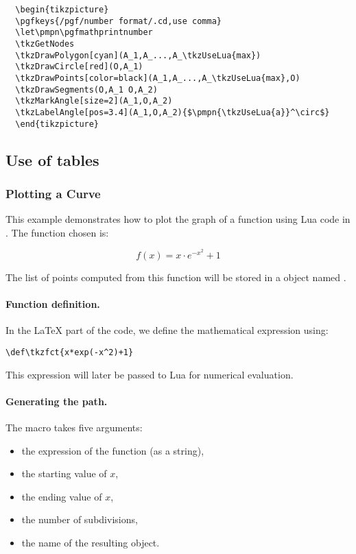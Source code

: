 \begin{verbatim}
  \begin{tikzpicture}
  \pgfkeys{/pgf/number format/.cd,use comma}
  \let\pmpn\pgfmathprintnumber
  \tkzGetNodes
  \tkzDrawPolygon[cyan](A_1,A_...,A_\tkzUseLua{max})
  \tkzDrawCircle[red](O,A_1)
  \tkzDrawPoints[color=black](A_1,A_...,A_\tkzUseLua{max},O)
  \tkzDrawSegments(O,A_1 O,A_2)
  \tkzMarkAngle[size=2](A_1,O,A_2)
  \tkzLabelAngle[pos=3.4](A_1,O,A_2){$\pmpn{\tkzUseLua{a}}^\circ$}
  \end{tikzpicture}
\end{verbatim}




\subsection{Use of tables} %
\label{sub:use_of_tables}



\subsubsection{Plotting a Curve} %
\label{ssub:plotting_a_curve}

This example demonstrates how to plot the graph of a function using Lua code in . The function chosen is:

\[
f(x) = x\cdot e^{-x^2} + 1
\]

The list of points computed from this function will be stored in a  object named .

\paragraph{Function definition.}
In the \LaTeX{} part of the code, we define the mathematical expression using:

\begin{center}
\verb|\def\tkzfct{x*exp(-x^2)+1}|
\end{center}

This expression will later be passed to Lua for numerical evaluation.

\paragraph{Generating the path.}
The macro  takes five arguments:
\begin{itemize}
  \item the expression of the function (as a string),
  \item the starting value of $x$,
  \item the ending value of $x$,
  \item the number of subdivisions,
  \item the name of the resulting  object.
\end{itemize}

